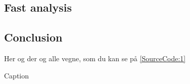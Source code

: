 \documentclass[a4paper, oneside, onecolumn, 11pt]{memoir}
\newenvironment{code}{\captionsetup{type=listing}}{}
\begin{document}

\subsection{Fast analysis}

\subsection{Conclusion}
Her og der og alle vegne, som du kan se på \cref{SourceCode:1}

\begin{code}
	\caption{Caption
    \label{SourceCode:1}}
    \inputminted[firstline=1, lastline=5, frame=single, framesep=2mm, fontsize=\footnotesize, linenos%
]{python}{kode.py}
\end{code}
\end{document}
